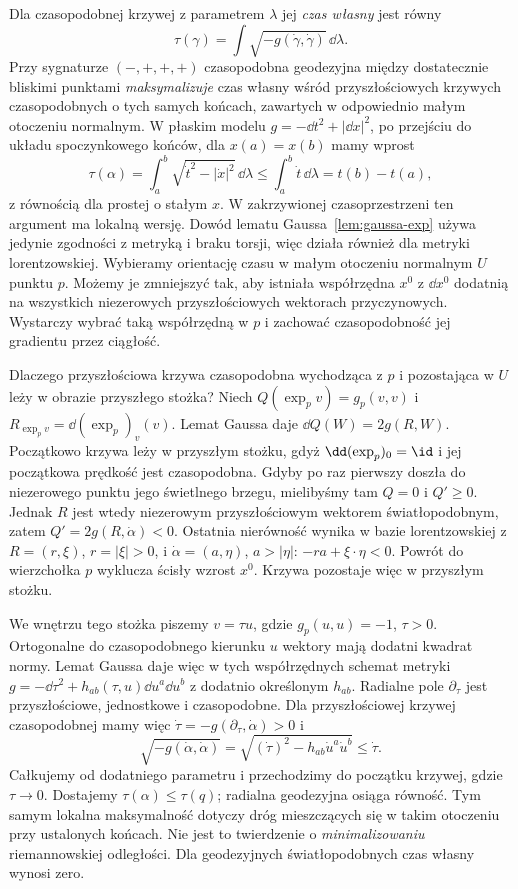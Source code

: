 Dla czasopodobnej krzywej z parametrem $\lambda$
jej \emph{czas własny} jest równy
\begin{equation}\label{eq:czas-wlasny}
 \tau(\gamma)=\int\sqrt{-g(\dot\gamma,\dot\gamma)}
                    \,\dd\lambda.
\end{equation}
Przy sygnaturze $(-,+,+,+)$ czasopodobna
geodezyjna między dostatecznie bliskimi
punktami \emph{maksymalizuje} czas własny
wśród przyszłościowych krzywych czasopodobnych o tych samych
końcach, zawartych w odpowiednio małym otoczeniu normalnym. W płaskim modelu
$g=-\dd t^2+|\dd x|^2$, po przejściu do
układu spoczynkowego końców, dla
$x(a)=x(b)$ mamy wprost
\[
 \tau(\alpha)=\int_a^b
 \sqrt{\dot t^2-|\dot x|^2}\,\dd\lambda
 \leq\int_a^b\dot t\,\dd\lambda=t(b)-t(a),
\]
z równością dla prostej o stałym $x$.
W zakrzywionej czasoprzestrzeni ten argument
ma lokalną wersję. Dowód lematu
Gaussa~\ref{lem:gaussa-exp} używa jedynie
zgodności z metryką i braku torsji, więc
działa również dla metryki lorentzowskiej.
Wybieramy orientację czasu w małym otoczeniu normalnym $U$
punktu $p$. Możemy je zmniejszyć tak, aby istniała współrzędna
$x^0$ z $\dd x^0$ dodatnią na wszystkich niezerowych
przyszłościowych wektorach przyczynowych. Wystarczy wybrać taką współrzędną
w $p$ i zachować czasopodobność jej gradientu przez ciągłość.

Dlaczego przyszłościowa krzywa czasopodobna wychodząca z $p$
i pozostająca w $U$ leży w obrazie przyszłego stożka?
Niech $Q(\exp_p v)=g_p(v,v)$ i $R_{\exp_p v}=\dd(\exp_p)_v(v)$.
Lemat Gaussa daje $\dd Q(W)=2g(R,W)$.
Początkowo krzywa leży w przyszłym stożku, gdyż
$\dd(\exp_p)_0=\id$ i jej początkowa prędkość jest czasopodobna.
Gdyby po raz pierwszy doszła do niezerowego punktu jego
świetlnego brzegu, mielibyśmy tam $Q=0$ i $Q'\geq0$.
Jednak $R$ jest wtedy niezerowym przyszłościowym wektorem
światłopodobnym, zatem $Q'=2g(R,\dot\alpha)<0$.
Ostatnia nierówność wynika w bazie lorentzowskiej z
$R=(r,\xi)$, $r=|\xi|>0$, i $\dot\alpha=(a,\eta)$,
$a>|\eta|$: $-ra+\xi\cdot\eta<0$.
Powrót do wierzchołka $p$ wyklucza ścisły wzrost $x^0$.
Krzywa pozostaje więc w przyszłym stożku.

We wnętrzu tego stożka
piszemy $v=\tau u$, gdzie $g_p(u,u)=-1$,
$\tau>0$. Ortogonalne do czasopodobnego
kierunku $u$ wektory mają dodatni kwadrat
normy. Lemat Gaussa daje więc w tych
współrzędnych schemat metryki
$g=-\dd\tau^2+h_{ab}(\tau,u)\dd u^a\dd u^b$
z dodatnio określonym $h_{ab}$.
Radialne pole $\partial_\tau$ jest przyszłościowe,
jednostkowe i czasopodobne. Dla przyszłościowej krzywej
czasopodobnej mamy więc $\dot\tau=-g(\partial_\tau,\dot\alpha)>0$ i
\[
 \sqrt{-g(\dot\alpha,\dot\alpha)}
 =\sqrt{(\dot\tau)^2-h_{ab}\dot u^a\dot u^b}
 \leq\dot\tau.
\]
Całkujemy od dodatniego parametru i przechodzimy do początku
krzywej, gdzie $\tau\to0$. Dostajemy $\tau(\alpha)
\leq\tau(q)$; radialna geodezyjna osiąga
równość. Tym samym lokalna maksymalność
dotyczy dróg mieszczących się w takim
otoczeniu przy ustalonych końcach.
Nie jest to twierdzenie o \emph{minimalizowaniu}
riemannowskiej odległości. Dla geodezyjnych
światłopodobnych czas własny wynosi zero.

